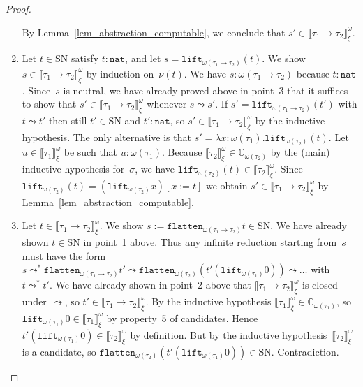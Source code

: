 \documentclass[runningheads,a4paper]{llncs}
\newcommand{\arrtype}{\rightarrow}
\newcommand{\subst}[2]{#1:=#2}
\newcommand{\nat}{\mathtt{nat}}
\newcommand{\flatten}{\mathtt{flatten}}
\newcommand{\lift}{\mathtt{lift}}
\newcommand{\SN}{\mathrm{SN}}
\newcommand{\Cb}{\mathbb{C}}
\newcommand{\val}[3]{\ensuremath{\llbracket#1\rrbracket_{#2}^{#3}}}
\begin{document}
\begin{proof}
\begin{enumerate}
    By Lemma~\ref{lem_abstraction_computable}, we conclude that $s'
    \in \val{\tau_1\arrtype\tau_2}{\xi}{\omega}$.
  \item Let $t \in \SN$ satisfy $t : \nat$, and let $s =
    \lift_{\omega(\tau_1\arrtype\tau_2)}(t)$. We show $s \in
    \val{\tau_1\arrtype\tau_2}{\xi}{\omega}$ by induction
    on~$\nu(t)$. We have $s : \omega(\tau_1\arrtype\tau_2)$ because $t
    : \nat$. Since~$s$ is neutral, we have already proved above in
    point~3 that it suffices to show that $s' \in
    \val{\tau_1\arrtype\tau_2}{\xi}{\omega}$ whenever $s \leadsto
    s'$. If $s' = \lift_{\omega(\tau_1\arrtype\tau_2)}(t')$ with $t
    \leadsto t'$ then still $t' \in \SN$ and $t' : \nat$, so $s' \in
    \val{\tau_1\arrtype\tau_2}{\xi}{\omega}$ by the inductive
    hypothesis. The only alternative is that $s' = \lambda x :
    \omega(\tau_1) . \lift_{\omega(\tau_2)}(t)$. Let $u \in
    \val{\tau_1}{\xi}{\omega}$ be such that $u :
    \omega(\tau_1)$. Because $\val{\tau_2}{\xi}{\omega} \in
    \Cb_{\omega(\tau_2)}$ by the (main) inductive hypothesis
    for~$\sigma$, we have $\lift_{\omega(\tau_2)}(t) \in
    \val{\tau_2}{\xi}{\omega}$. Since $\lift_{\omega(\tau_2)}(t) =
    (\lift_{\omega(\tau_2)}x)[\subst{x}{t}]$ we obtain $s' \in
    \val{\tau_1\arrtype\tau_2}{\xi}{\omega}$ by
    Lemma~\ref{lem_abstraction_computable}.
  \item Let $t \in \val{\tau_1\arrtype\tau_2}{\xi}{\omega}$.  We show
    $s := \flatten_{\omega(\tau_1\arrtype\tau_2)}t \in \SN$. We have
    already shown $t \in \SN$ in point~1 above. Thus any infinite
    reduction starting from~$s$ must have the form $s \leadsto^*
    \flatten_{\omega(\tau_1\arrtype\tau_2)}t' \leadsto
    \flatten_{\omega(\tau_2)}(t' (\lift_{\omega(\tau_1)}0)) \leadsto
    \ldots$ with $t \leadsto^* t'$. We have already shown in point~2
    above that $\val{\tau_1\arrtype\tau_2}{\xi}{\omega}$ is closed
    under~$\leadsto$, so $t' \in
    \val{\tau_1\arrtype\tau_2}{\xi}{\omega}$. By the inductive
    hypothesis $\val{\tau_1}{\xi}{\omega} \in\Cb_{\omega(\tau_1)}$, so
    $\lift_{\omega(\tau_1)}0 \in \val{\tau_1}{\xi}{\omega}$ by
    property~5 of candidates. Hence $t' (\lift_{\omega(\tau_1)}0) \in
    \val{\tau_2}{\xi}{\omega}$ by definition. But by the inductive
    hypothesis~$\val{\tau_2}{\xi}{\omega}$ is a candidate, so
    $\flatten_{\omega(\tau_2)}(t'(\lift_{\omega(\tau_1)}0))\in\SN$. Contradiction.
  \end{enumerate}


\end{proof}
\end{document}
